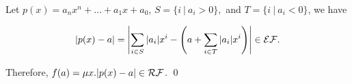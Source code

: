 
\begin{pf} \rm
 Let $p(x) = a_n x^n + \ldots + a_1 x + a_0$, 
 $S=\{i~|~a_i > 0\}, $ and $T =\{i~|~a_i < 0\}$, we have

\[\displaystyle |p(x) - a| = 
 \left|
  \sum_{i\in S} |a_i| x^i - \left( a + \sum_{i\in T} |a_i| x^i \right)
 \right| \in \mathcal{EF}.\]

\noindent Therefore, $f(a) = \mu x. |p(x) - a|\in\mathcal{RF}$. \qed
\end{pf}
